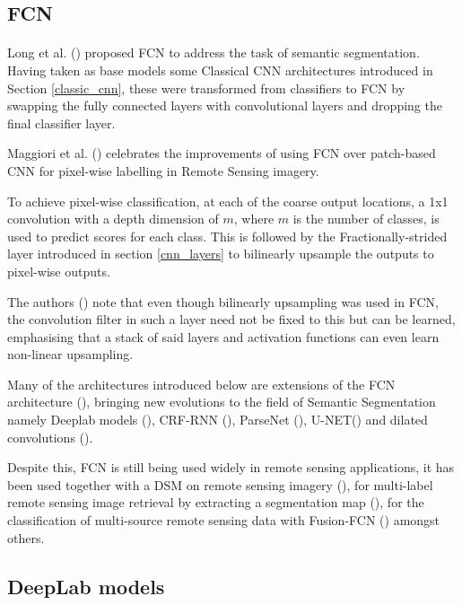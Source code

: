\subsection{\gls{FCN}} 
\paragraph{}
Long et al. (\cite{long2015fully}) proposed \gls{FCN} to address the task of semantic segmentation. Having taken as base models some Classical \gls{CNN} architectures introduced in Section \ref{classic_cnn}, these were transformed from classifiers to \gls{FCN} by swapping the fully connected layers with convolutional layers and dropping the final classifier layer. 

Maggiori et al. (\cite{7730322}) celebrates the improvements of using \gls{FCN} over patch-based \gls{CNN} for pixel-wise labelling in Remote Sensing imagery.

To achieve pixel-wise classification, at each of the coarse output locations, a 1x1 convolution with a depth dimension of $m$, where $m$ is the number of classes, is used to predict scores for each class. This is followed by the Fractionally-strided layer introduced in section \ref{cnn_layers} to bilinearly upsample the outputs to pixel-wise outputs. 

The authors (\cite{long2015fully}) note that even though bilinearly upsampling was used in \gls{FCN}, the convolution filter in such a layer need not be fixed to this but can be learned, emphasising that a stack of said layers and activation functions can even learn non-linear upsampling.

Many of the architectures introduced below are extensions of the \gls{FCN} architecture (\cite{long2015fully}), bringing new evolutions to the field of Semantic Segmentation namely Deeplab models (\cite{chen2016semantic}), \gls{CRF}-\gls{RNN} (\cite{Zheng_2015}), ParseNet (\cite{liu2015parsenet}), U-NET(\cite{ronneberger2015unet}) and dilated convolutions (\cite{yu2016multiscale}).

Despite this, \gls{FCN} is still being used widely in remote sensing applications, it has been used together with a \gls{DSM} on remote sensing imagery (\cite{8281008}), for multi-label remote sensing image retrieval by extracting a segmentation map (\cite{8954885}), for the classification of multi-source remote sensing data with Fusion-\gls{FCN} (\cite{8518295}) amongst others.

\subsection{DeepLab models}

